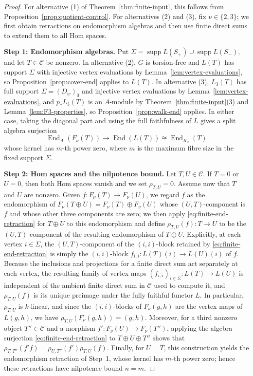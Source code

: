 \documentclass[a4paper,reqno,10pt]{amsart}
\theoremstyle{definition}
\DeclareMathOperator{\End}{End}
\DeclareMathOperator{\supp}{supp}
\newcommand{\C}{\mathcal C}
\numberwithin{equation}{section}
\begin{document}
\begin{proof}
For alternative (1) of Theorem~\ref{thm:finite-input}, this follows from Proposition~\ref{prop:quotient-control}. For alternatives (2) and (3), fix $\nu\in\{2,3\}$; we first obtain
retractions on endomorphism algebras and then use finite direct sums to
extend them to all Hom spaces.

\noindent\textbf{Step 1: Endomorphism algebras.}
Put
$\Sigma=\supp L(S_+)\cup\supp L(S_-)$, and let $T\in\C$ be nonzero. In alternative (2),
$G$ is torsion-free and $L(T)$ has support $\Sigma$ with injective vertex evaluations by
Lemma~\ref{lem:vertex-evaluations}, so Proposition~\ref{prop:cover-end} applies to $L(T)$. In alternative (3),
$L_3(T)$ has full support $\Sigma=(D_w)_0$ and
injective vertex evaluations by Lemma~\ref{lem:vertex-evaluations}, and
$p_*L_3(T)$ is an $A$-module by Theorem~\ref{thm:finite-input}(3) and Lemma~\ref{lem:F3-properties},
so Proposition~\ref{prop:walk-end} applies.
In either case, taking the diagonal part and using the full faithfulness of $L$ gives a split algebra surjection
\begin{equation}\label{eq:finite-end-retraction}
 \End_A(F_\nu(T))\longrightarrow\End(L(T))
 \cong\End_{K_2}(T)
\end{equation}
whose kernel has $m$-th power zero, where
$m$ is the maximum fibre size in the fixed support $\Sigma$.

\noindent\textbf{Step 2: Hom spaces and the nilpotence bound.}
Let $T,U\in\C$.
If $T=0$ or $U=0$, then both Hom spaces vanish and we set
$\rho_{T,U}=0$.
Assume now that $T$ and $U$ are nonzero. Given $f:F_\nu(T)\to F_\nu(U)$, we
regard $f$ as the endomorphism of
$F_\nu(T\oplus U)=F_\nu(T)\oplus F_\nu(U)$
whose $(U,T)$-component is $f$ and whose other three components are zero; we then apply
\eqref{eq:finite-end-retraction} for $T\oplus U$ to this endomorphism and define
$\rho_{T,U}(f):T\to U$ to be the $(U,T)$-component of the resulting
endomorphism of $T\oplus U$. Explicitly, at each vertex $i\in\Sigma$, the $(U,T)$-component of the $(i,i)$-block retained by
\eqref{eq:finite-end-retraction} is
simply the $(i,i)$-block $f_{i,i}:L(T)(i)\to L(U)(i)$ of $f$. Because the inclusions and
projections for a finite direct sum act separately at each vertex,
the resulting family of vertex maps $(f_{i,i})_{i\in\Sigma}:L(T)\to L(U)$ is independent of the ambient finite direct sum in $\C$ used to compute it,
and $\rho_{T,U}(f)$ is its unique preimage under the fully faithful functor $L$.
In particular, $\rho_{T,U}$ is $k$-linear, and since the $(i,i)$-blocks of
$F_\nu(g,h)$ are the vertex maps of
$L(g,h)$, we have $\rho_{T,U}(F_\nu(g,h))=(g,h)$.
Moreover, for a third nonzero object $T''\in\C$ and a morphism $f':F_\nu(U)\to F_\nu(T'')$,
applying the algebra surjection \eqref{eq:finite-end-retraction} to $T\oplus U\oplus T''$
shows that $\rho_{T,T''}(f'f)=\rho_{U,T''}(f')\rho_{T,U}(f)$.
Finally, for $U=T$, this construction yields the endomorphism retraction
of Step~1, whose kernel has $m$-th power zero; hence these retractions have
nilpotence bound $n=m$.
\end{proof}
\end{document}
